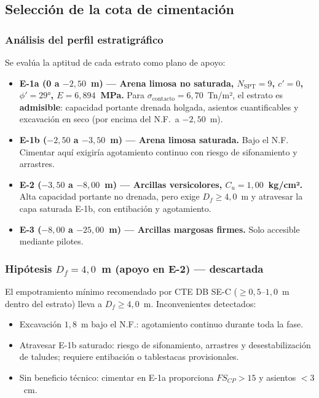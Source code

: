 \subsection{Selección de la cota de cimentación}
\label{subsec:seleccion_cota_arqueta}

\subsubsection*{Análisis del perfil estratigráfico}

Se evalúa la aptitud de cada estrato como plano de apoyo:

\begin{itemize}
  \item \textbf{E-1a (0 a $-2{,}50$~m) — Arena limosa no saturada, $N_\text{SPT}=9$,
    $c'=0$, $\phi'=29°$, $E=6{,}894$~MPa.}
    Para $\sigma_\text{contacto}=6{,}70$~Tn/m², el estrato es \textbf{admisible}:
    capacidad portante drenada holgada, asientos cuantificables y excavación en seco
    (por encima del N.F.\ a $-2{,}50$~m).
  \item \textbf{E-1b ($-2{,}50$ a $-3{,}50$~m) — Arena limosa saturada.}
    Bajo el N.F. Cimentar aquí exigiría agotamiento continuo con riesgo de
    sifonamiento y arrastres.
  \item \textbf{E-2 ($-3{,}50$ a $-8{,}00$~m) — Arcillas versicolores, $C_u=1{,}00$~kg/cm².}
    Alta capacidad portante no drenada, pero exige $D_f\geq4{,}0$~m y atravesar la
    capa saturada E-1b, con entibación y agotamiento.
  \item \textbf{E-3 ($-8{,}00$ a $-25{,}00$~m) — Arcillas margosas firmes.}
    Solo accesible mediante pilotes.
\end{itemize}

\subsubsection*{Hipótesis $D_f=4{,}0$~m (apoyo en E-2) — descartada}

El empotramiento mínimo recomendado por CTE DB SE-C ($\geq 0{,}5$–$1{,}0$~m
dentro del estrato) lleva a $D_f\geq4{,}0$~m. Inconvenientes detectados:
\begin{itemize}
  \item Excavación $1{,}8$~m bajo el N.F.: agotamiento continuo durante toda la fase.
  \item Atravesar E-1b saturado: riesgo de sifonamiento, arrastres y desestabilización
        de taludes; requiere entibación o tablestacas provisionales.
  \item Sin beneficio técnico: cimentar en E-1a proporciona $FS_{CP}>15$ y
        asientos $<3$~cm.
\end{itemize}

